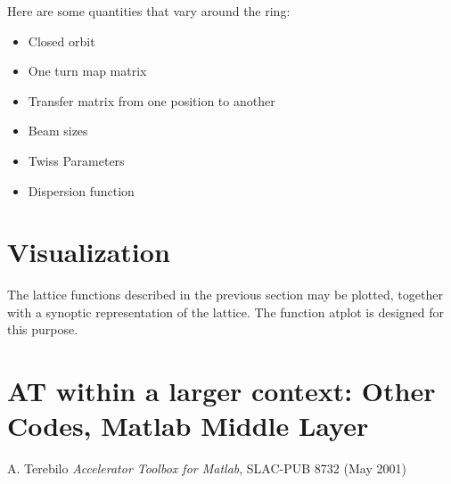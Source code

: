 \documentclass[acus]{article}
\begin{document}
Here are some quantities that vary around the ring:
\begin{itemize}
\item Closed orbit
\item One turn map matrix
\item Transfer matrix from one position to another
\item Beam sizes
\item Twiss Parameters
\item Dispersion function
\end{itemize}


\section{Visualization}
The lattice functions described in the previous section may be plotted, together with a synoptic representation of the lattice.  The function atplot is designed for this purpose.

\section{AT within a larger context: Other Codes, Matlab Middle Layer}

\begin{thebibliography}{2}

A. Terebilo \emph{Accelerator Toolbox for Matlab}, SLAC-PUB 8732 (May 2001)

\end{thebibliography}
\end{document}
